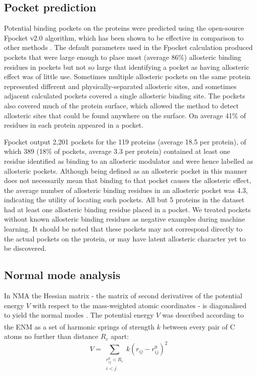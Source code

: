 \subsection{Pocket prediction}

Potential binding pockets on the proteins were predicted using the open-source Fpocket v2.0 algorithm, which has been shown to be effective in comparison to other methods \cite{LeGuilloux2009}.
The default parameters used in the Fpocket calculation produced pockets that were large enough to place most (average 86\%) allosteric binding residues in pockets but not so large that identifying a pocket as having allosteric effect was of little use.
Sometimes multiple allosteric pockets on the same protein represented different and physically-separated allosteric sites, and sometimes adjacent calculated pockets covered a single allosteric binding site.
The pockets also covered much of the protein surface, which allowed the method to detect allosteric sites that could be found anywhere on the surface.
On average 41\% of residues in each protein appeared in a pocket.

Fpocket output 2,201 pockets for the 119 proteins (average 18.5 per protein), of which 389 (18\% of pockets, average 3.3 per protein) contained at least one residue identified as binding to an allosteric modulator and were hence labelled as allosteric pockets.
Although being defined as an allosteric pocket in this manner does not necessarily mean that binding to that pocket causes the allosteric effect, the average number of allosteric binding residues in an allosteric pocket was 4.3, indicating the utility of locating such pockets.
All but 5 proteins in the dataset had at least one allosteric binding residue placed in a pocket.
We treated pockets without known allosteric binding residues as negative examples during machine learning.
It should be noted that these pockets may not correspond directly to the actual pockets on the protein, or may have latent allosteric character yet to be discovered.


\subsection{Normal mode analysis}

In NMA the Hessian matrix - the matrix of second derivatives of the potential energy $V$ with respect to the mass-weighted atomic coordinates - is diagonalised to yield the normal modes \cite{Hayward2008}.
The potential energy $V$ was described according to the ENM \cite{Tirion1996} as a set of harmonic springs of strength $k$ between every pair of C\textsuperscript{\textalpha} atoms no further than distance $R_{c}$ apart:
$$
V = \sum_{\substack{r_{ij}^{0} < R_{c} \\ i < j}} k (r_{ij} - r_{ij}^{0})^{2}
$$

